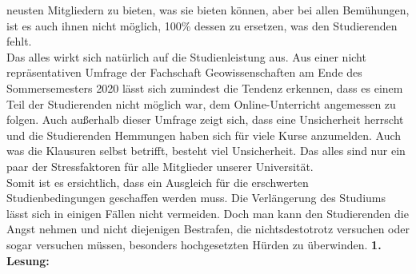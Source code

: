         neusten Mitgliedern zu bieten, was sie bieten können, aber bei allen Bemühungen, ist es auch ihnen
        nicht möglich, 100\% dessen zu ersetzen, was den Studierenden fehlt.\\
        Das alles wirkt sich natürlich auf die Studienleistung aus. Aus einer nicht repräsentativen Umfrage
        der Fachschaft Geowissenschaften am Ende des Sommersemesters 2020 lässt sich zumindest die
        Tendenz erkennen, dass es einem Teil der Studierenden nicht möglich war, dem Online-Unterricht
        angemessen zu folgen. Auch außerhalb dieser Umfrage zeigt sich, dass eine Unsicherheit herrscht
        und die Studierenden Hemmungen haben sich für viele Kurse anzumelden. Auch was die
        Klausuren selbst betrifft, besteht viel Unsicherheit. Das alles sind nur ein paar der Stressfaktoren
        für alle Mitglieder unserer Universität.\\
        Somit ist es ersichtlich, dass ein Ausgleich für die erschwerten Studienbedingungen geschaffen
        werden muss. Die Verlängerung des Studiums lässt sich in einigen Fällen nicht vermeiden. Doch
        man kann den Studierenden die Angst nehmen und nicht diejenigen Bestrafen, die nichtsdestotrotz
        versuchen oder sogar versuchen müssen, besonders hochgesetzten Hürden zu überwinden.
        \textbf{1. Lesung:}
        \ul{
        }

